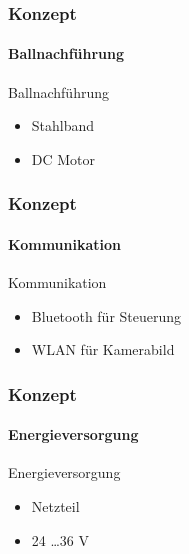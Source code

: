 \begin{frame}
    \frametitle{Konzept}
    \framesubtitle{Ballnachführung}
    \begin{block}{Ballnachführung}
        \begin{itemize}
            \item Stahlband
            \item DC Motor
        \end{itemize}
    \end{block}
\end{frame}

\begin{frame}
    \frametitle{Konzept}
    \framesubtitle{Kommunikation}
    \begin{block}{Kommunikation}
        \begin{itemize}
            \item Bluetooth für Steuerung
            \item WLAN für Kamerabild
        \end{itemize}
    \end{block}
\end{frame}

\begin{frame}
    \frametitle{Konzept}
    \framesubtitle{Energieversorgung}
    \begin{block}{Energieversorgung}
        \begin{itemize}
            \item Netzteil
            \item 24 \ldots 36 V
        \end{itemize}
    \end{block}
\end{frame}

